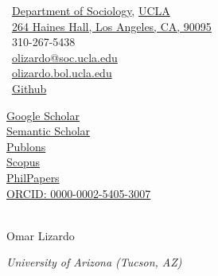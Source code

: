 \documentclass[10pt]{article}
\makeatletter
\def\myemail{olizardo@soc.ucla.edu}
\def\myweb{http://olizardo.bol.ucla.edu}
\def\myphone{310-267-5438}
\makeatother
\begin{document}
\begin{minipage}[t]{3in}
    \small
    \faUniversity \, \href{https://soc.ucla.edu}{Department of Sociology}, \href{https://ucla.edu}{UCLA} \\
    \faLocationArrow \, \href{https://goo.gl/maps/Ge1pAsh17ANWcdRB7}{264 Haines Hall, Los Angeles, CA, 90095} \\
    \faPhone \, \myphone  \\ 
    \faEnvelope \, \href{mailto:\myemail}{\myemail} \\
    \faGlobe \, \href{\myweb}{olizardo.bol.ucla.edu} \\
    \faGithub \, \href{https://github.com/olizardo}{Github}    
\end{minipage}
\hfill     
\hfill
\begin{minipage}[t]{3in}
    \flushleft
    \small 
    \href{https://scholar.google.com/citations?user=Lt5nMNkAAAAJ&hl=en}{Google Scholar} \\
    \href{https://www.semanticscholar.org/author/Omar-Lizardo/2632398}{Semantic Scholar} \\
    \href{https://publons.com/researcher/1372654/omar-lizardo}{Publons} \\
    \href{https://www.scopus.com/authid/detail.uri?authorId=6508228764}{Scopus} \\
    \href{https://philpeople.org/profiles/omar-lizardo}{PhilPapers} \\
    \href{https://orcid.org/0000-0002-5405-3007}{ORCID: 0000-0002-5405-3007} \\
    \
\end{minipage}
\bigskip
\bigskip

\newcommand{\myname}{ \noindent}
\begin{center}
    {\myname  Omar Lizardo}
\end{center}

\reversemarginpar
\bigskip
\bigskip
\noindent\emph{University of Arizona (Tucson, AZ) \vspace{0.01in}}
\end{document}
